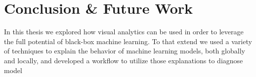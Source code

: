 \chapter{Conclusion \& Future Work}
\label{chap:future_work}

In this thesis we explored how visual analytics can be used in order to leverage the full potential of black-box machine learning.
To that extend we used a variety of techniques to explain the behavior of machine learning models, both globally and locally, and developed a workflow to utilize those explanations to diagnose model 

